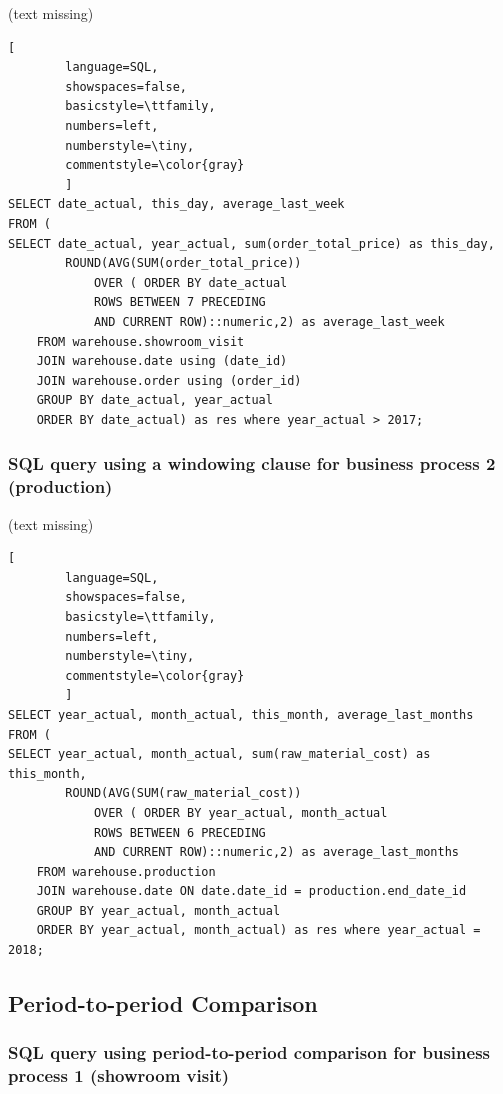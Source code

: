\documentclass[letterpaper,12pt]{article}
\begin{document}
(text missing)

\begin{lstlisting}[
        language=SQL,
        showspaces=false,
        basicstyle=\ttfamily,
        numbers=left,
        numberstyle=\tiny,
        commentstyle=\color{gray}
        ]																			   
SELECT date_actual, this_day, average_last_week	
FROM (																		   
SELECT date_actual, year_actual, sum(order_total_price) as this_day, 
		ROUND(AVG(SUM(order_total_price))
			OVER ( ORDER BY date_actual
			ROWS BETWEEN 7 PRECEDING
			AND CURRENT ROW)::numeric,2) as average_last_week
	FROM warehouse.showroom_visit
	JOIN warehouse.date using (date_id)
	JOIN warehouse.order using (order_id)
	GROUP BY date_actual, year_actual
	ORDER BY date_actual) as res where year_actual > 2017;
\end{lstlisting}				  
                
\subsubsection{SQL query using a windowing clause for business process 2 (production)}
(text missing)

\begin{lstlisting}[
        language=SQL,
        showspaces=false,
        basicstyle=\ttfamily,
        numbers=left,
        numberstyle=\tiny,
        commentstyle=\color{gray}
        ]			  
SELECT year_actual, month_actual, this_month, average_last_months
FROM (
SELECT year_actual, month_actual, sum(raw_material_cost) as this_month, 
		ROUND(AVG(SUM(raw_material_cost))
			OVER ( ORDER BY year_actual, month_actual
			ROWS BETWEEN 6 PRECEDING
			AND CURRENT ROW)::numeric,2) as average_last_months
	FROM warehouse.production
	JOIN warehouse.date ON date.date_id = production.end_date_id
	GROUP BY year_actual, month_actual
	ORDER BY year_actual, month_actual) as res where year_actual = 2018;
\end{lstlisting}				  
        
\subsection{Period-to-period Comparison}

\subsubsection{SQL query using period-to-period comparison for business process 1 (showroom visit)}
\end{document}

